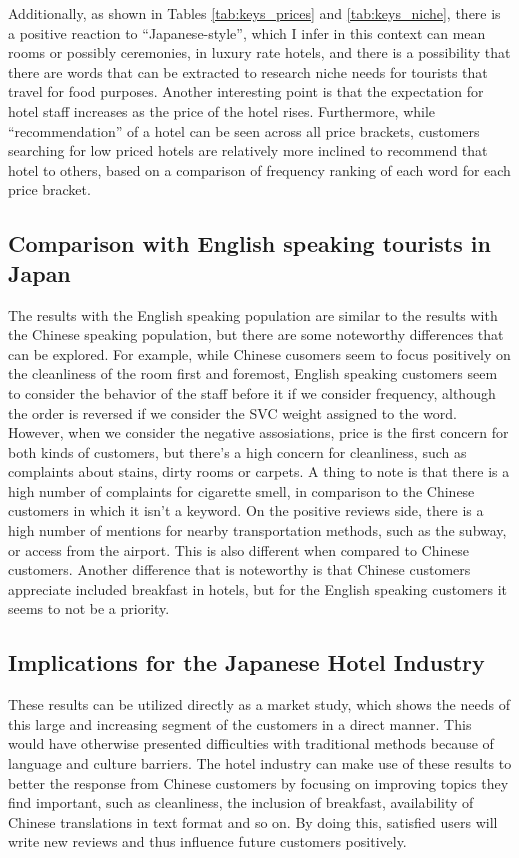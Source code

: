 \documentclass[review]{elsarticle}
\begin{document}
Additionally, as shown in Tables \ref{tab:keys_prices} and \ref{tab:keys_niche}, there is a positive reaction to “Japanese-style”, which I infer in this context can mean rooms or possibly ceremonies, in luxury rate hotels, and there is a possibility that there are words that can be extracted to research niche needs for tourists that travel for food purposes. Another interesting point is that the expectation for hotel staff increases as the price of the hotel rises. Furthermore, while “recommendation” of a hotel can be seen across all price brackets, customers searching for low priced hotels are relatively more inclined to recommend that hotel to others, based on a comparison of frequency ranking of each word for each price bracket.

\subsection{Comparison with English speaking tourists in Japan}

The results with the English speaking population are similar to the results with the Chinese speaking population, but there are some noteworthy differences that can be explored. For example, while Chinese cusomers seem to focus positively on the cleanliness of the room first and foremost, English speaking customers seem to consider the behavior of the staff before it if we consider frequency, although the order is reversed if we consider the SVC weight assigned to the word. However, when we consider the negative assosiations, price is the first concern for both kinds of customers, but there's a high concern for cleanliness, such as complaints about stains, dirty rooms or carpets. A thing to note is that there is a high number of complaints for cigarette smell, in comparison to the Chinese customers in which it isn't a keyword. On the positive reviews side, there is a high number of mentions for nearby transportation methods, such as the subway, or access from the airport. This is also different when compared to Chinese customers. Another difference that is noteworthy is that Chinese customers appreciate included breakfast in hotels, but for the English speaking customers it seems to not be a priority.

\subsection{Implications for the Japanese Hotel Industry}\label{discussionimplications}

These results can be utilized directly as a market study, which shows the needs of this large and increasing segment of the customers in a direct manner. This would have otherwise presented difficulties with traditional methods because of language and culture barriers. The hotel industry can make use of these results to better the response from Chinese customers by focusing on improving topics they find important, such as cleanliness, the inclusion of breakfast, availability of Chinese translations in text format and so on. By doing this, satisfied users will write new reviews and thus influence future customers positively.
\end{document}
